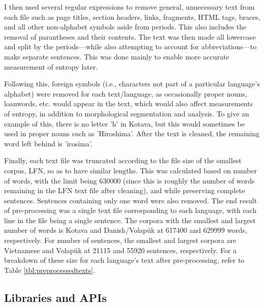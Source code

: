 \documentclass[12pt,a4paper]{article}
\numberwithin{figure}{section}
\numberwithin{table}{section}
\numberwithin{definition}{section}
\begin{document}
I then used several regular expressions to remove general, unnecessary text from each file such as page titles, section headers, links, fragments, HTML tags, braces, and all other non-alphabet symbols aside from periods. This also includes the removal of parantheses and their contents. The text was then made all lowercase and split by the periods---while also attempting to account for abbreviations---to make separate sentences. This was done mainly to enable more accurate measurement of entropy later.

Following this, foreign symbols (i.e., characters not part of a particular language's alphabet) were removed for each text/language, as occasionally proper nouns, loanwords, etc. would appear in the text, which would also affect measurements of entropy, in addition to morphological segmentation and analysis. To give an example of this, there is no letter 'h' in Kotava, but this would sometimes be used in proper nouns such as 'Hiroshima'. After the text is cleaned, the remaining word left behind is 'irosima'. 

Finally, each text file was truncated according to the file size of the smallest corpus, LFN, so as to have similar lengths. This was calculated based on number of words, with the limit being 630000 (since this is roughly the number of words remaining in the LFN text file after cleaning), and while preserving complete sentences. Sentences containing only one word were also removed. The end result of pre-processing was a single text file corresponding to each language, with each line in the file being a single sentence. The corpora with the smallest and largest number of words is Kotava and Danish/Volapük at 617400 and 629999 words, respectively. For number of sentences, the smallest and largest corpora are Vietnamese and Volapük at 21115 and 55920 sentences, respectively. For a breakdown of these size for each language's text after pre-processing, refer to Table \ref{tbl:preprocessedtexts}.

\subsection{Libraries and APIs}
\label{ssec:librariesandapis}
\end{document}
